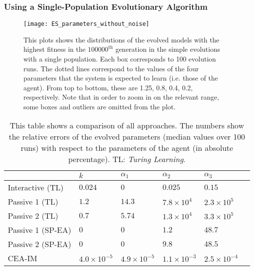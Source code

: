 \subsubsection{Using a Single-Population Evolutionary Algorithm}\label{sec:single_population_EA_deterministic_interaction}
\begin{figure}[!t]
	\centering
	\texttt{[image: ES\_parameters\_without\_noise]}
	\caption{This plots shows the distributions of the evolved models with the highest fitness in the $100000^\textrm{th}$ generation in the simple evolutions with a single population. Each box corresponds to 100 evolution runs. The dotted lines correspond to the values of the four parameters that the system is expected to learn (i.e. those of the agent). From top to bottom, these are 1.25, 0.8, 0.4, 0.2, respectively. Note that in order to zoom in on the relevant range, some boxes and outliers are omitted from the plot. \label{fig:evolution}}
\end{figure}

\begin{table}[!t] 
\caption{This table shows a comparison of all approaches. The numbers show the relative errors of the evolved parameters (median values over 100 runs) with respect to the parameters of the agent (in absolute percentage). TL: \textit{Turing Learning}.} 
\renewcommand{\arraystretch}{1.1}
\centering %
\begin{tabular}{l l l l l l} %
\hline\hline  %
 & $k$ & $\alpha_1$ & $\alpha_2$ & $\alpha_3$ &  \\  
\hline   %
Interactive (TL) & $0.024$ & $0$ & $0.025$ & $0.15$\\ %
Passive 1 (TL) & $1.2$ & $14.3$ & $7.8\times10^4$ & $2.3\times10^5$\\ 
Passive 2 (TL) & $0.7$ & $5.74$ & $1.3\times10^4$ & $3.3\times10^5$\\ 
Passive 1 (SP-EA) & $0$ & $0$ & $1.2$ & $48.7$ \\ 
Passive 2 (SP-EA) & $0$ & $0$ & $9.8$ & $48.5$ \\  %
CEA-IM & $4.0\times10^{-5}$ & $4.9\times10^{-5}$ & $1.1\times10^{-3}$ & $2.5\times10^{-4}$ \\  %
\hline %
\end{tabular} 
\label{table:relative_accuracy} %
\end{table} 

